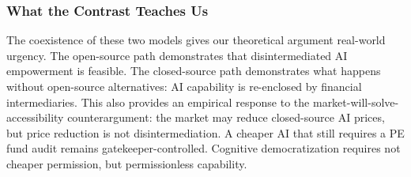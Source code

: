 \subsubsection{What the Contrast Teaches Us}

The coexistence of these two models gives our theoretical argument real-world urgency. The open-source path demonstrates that disintermediated AI empowerment is feasible. The closed-source path demonstrates what happens without open-source alternatives: AI capability is re-enclosed by financial intermediaries. This also provides an empirical response to the market-will-solve-accessibility counterargument: the market may reduce closed-source AI prices, but price reduction is not disintermediation. A cheaper AI that still requires a PE fund audit remains gatekeeper-controlled. Cognitive democratization requires not cheaper permission, but permissionless capability.
